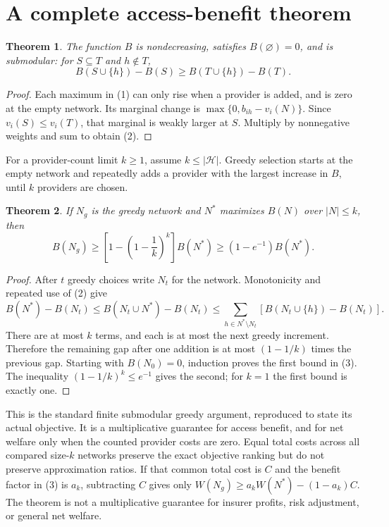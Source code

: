 \documentclass[11pt,a4paper]{article}
\newtheorem{theorem}{Theorem}[section]
\begin{document}
\section{A complete access-benefit theorem}
\begin{theorem}
The function $B$ is nondecreasing, satisfies $B(\varnothing)=0$, and is submodular:
for $S\subseteq T$ and $h\notin T$,
\[
 B(S\cup\{h\})-B(S)\ge B(T\cup\{h\})-B(T).
 \tag{2}
\]
\end{theorem}
\begin{proof}
Each maximum in (1) can only rise when a provider is added, and is zero at the empty network. Its marginal change is
$\max\{0,b_{ih}-v_i(N)\}$. Since $v_i(S)\le v_i(T)$, that marginal is weakly larger at $S$. Multiply by nonnegative weights and sum to obtain (2).
\end{proof}
For a provider-count limit $k\ge1$, assume $k\le|\mathcal H|$. Greedy selection starts at the empty network and repeatedly adds a provider with the largest increase in $B$, until $k$ providers are chosen.

\begin{theorem}
If $N_g$ is the greedy network and $N^*$ maximizes $B(N)$ over $|N|\le k$, then
\[
 B(N_g)\ge\left[1-\left(1-\frac1k\right)^k\right]B(N^*)
 \ge(1-e^{-1})B(N^*).
 \tag{3}
\]
\end{theorem}
\begin{proof}
After $t$ greedy choices write $N_t$ for the network. Monotonicity and repeated use of (2) give
\[
 B(N^*)-B(N_t)
 \le B(N_t\cup N^*)-B(N_t)
 \le\sum_{h\in N^*\setminus N_t}
          [B(N_t\cup\{h\})-B(N_t)].
\]
There are at most $k$ terms, and each is at most the next greedy increment. Therefore the remaining gap after one addition is at most $(1-1/k)$ times the previous gap. Starting with $B(N_0)=0$, induction proves the first bound in (3). The inequality $(1-1/k)^k\le e^{-1}$ gives the second; for $k=1$ the first bound is exactly one.
\end{proof}
This is the standard finite submodular greedy argument, reproduced to state its actual objective. It is a multiplicative guarantee for access benefit, and for net welfare only when the counted provider costs are zero. Equal total costs across all compared size-$k$ networks preserve the exact objective ranking but do not preserve approximation ratios. If that common total cost is $C$ and the benefit factor in (3) is $a_k$, subtracting $C$ gives only $W(N_g)\ge a_kW(N^*)-(1-a_k)C$. The theorem is not a multiplicative guarantee for insurer profits, risk adjustment, or general net welfare.
\end{document}
